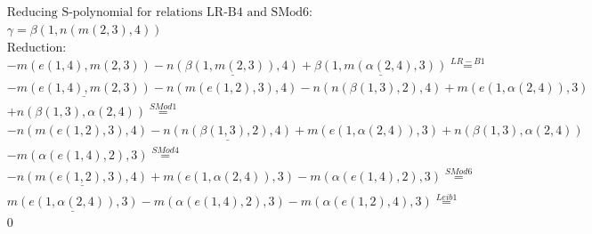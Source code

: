 \documentclass[11pt]{amsart}
\begin{document}
\begin{align*} 
& \text{Reducing S-polynomial for relations LR-B4 and SMod6:} \\ 
& \gamma = \beta(1,n(m(2,3),4)) \\ 
& \text{Reduction}: \\& - m(e(1,4),m(2,3)) - \underline{n(\beta(1,m(2,3)),4)} + \underline{\beta(1,m(\alpha(2,4),3))} \stackrel{ LR-B1 }{=}  \\ 
& - \underline{m(e(1,4),m(2,3))} - n(m(e(1,2),3),4) - n(n(\beta(1,3),2),4) + m(e(1,\alpha(2,4)),3)\\ 
 &  + n(\beta(1,3),\alpha(2,4)) \stackrel{ SMod1 }{=}  \\ 
& - n(m(e(1,2),3),4) - \underline{n(n(\beta(1,3),2),4)} + m(e(1,\alpha(2,4)),3) + n(\beta(1,3),\alpha(2,4))\\ 
 &  - m(\alpha(e(1,4),2),3) \stackrel{ SMod4 }{=}  \\ 
& - \underline{n(m(e(1,2),3),4)} + m(e(1,\alpha(2,4)),3) - m(\alpha(e(1,4),2),3) \stackrel{ SMod6 }{=}  \\ 
&\underline{m(e(1,\alpha(2,4)),3)} - m(\alpha(e(1,4),2),3) - m(\alpha(e(1,2),4),3) \stackrel{ Leib1 }{=}  \\ 
&0\\ 
\end{align*} 
 
\end{document}
